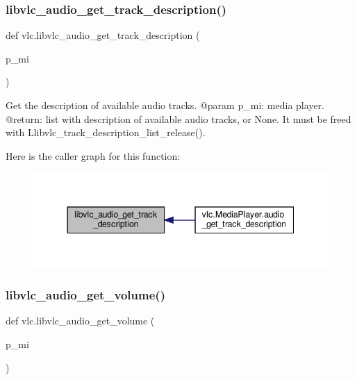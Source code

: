 \subsubsection{\texorpdfstring{libvlc\+\_\+audio\+\_\+get\+\_\+track\+\_\+description()}{libvlc\_audio\_get\_track\_description()}}
{\footnotesize\ttfamily def vlc.\+libvlc\+\_\+audio\+\_\+get\+\_\+track\+\_\+description (\begin{DoxyParamCaption}\item[{}]{p\+\_\+mi }\end{DoxyParamCaption})}

\begin{DoxyVerb}Get the description of available audio tracks.
@param p_mi: media player.
@return: list with description of available audio tracks, or None. It must be freed with L{libvlc_track_description_list_release}().
\end{DoxyVerb}
 Here is the caller graph for this function\+:
\nopagebreak
\begin{figure}[H]
\begin{center}
\leavevmode
\includegraphics[width=344pt]{namespacevlc_aeef886dffdb2d28ef62fb5a2314c69b3_icgraph}
\end{center}
\end{figure}
\mbox{\label{namespacevlc_a5bd4ab471d93bb2285affbfb6b865010}} 
\subsubsection{\texorpdfstring{libvlc\+\_\+audio\+\_\+get\+\_\+volume()}{libvlc\_audio\_get\_volume()}}
{\footnotesize\ttfamily def vlc.\+libvlc\+\_\+audio\+\_\+get\+\_\+volume (\begin{DoxyParamCaption}\item[{}]{p\+\_\+mi }\end{DoxyParamCaption})}

